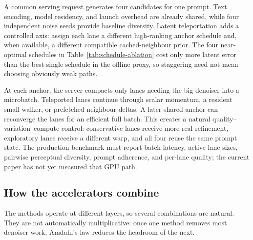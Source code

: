 \documentclass[11pt,a4paper]{article}
\begin{document}
A common serving request generates four candidates for one prompt. Text
encoding, model residency, and launch overhead are already shared, while four
independent noise seeds provide baseline diversity. Latent teleportation adds a
controlled axis: assign each lane a different high-ranking anchor schedule and,
when available, a different compatible cached-neighbour prior. The four
near-optimal schedules in Table~\ref{tab:schedule-ablation} cost only
\StaggeredGap{} more latent error than the best single schedule in the offline
proxy, so staggering need not mean choosing obviously weak paths.

At each anchor, the server compacts only lanes needing the big denoiser into a
microbatch. Teleported lanes continue through scalar momentum, a resident small
walker, or prefetched neighbour deltas. A later shared anchor can reconverge the
lanes for an efficient full batch. This creates a natural
quality--variation--compute control: conservative lanes receive more real
refinement, exploratory lanes receive a different warp, and all four reuse the
same prompt state. The production benchmark must report batch latency,
active-lane sizes, pairwise perceptual diversity, prompt adherence, and
per-lane quality; the current paper has not yet measured that GPU path.

\subsection{How the accelerators combine}

The methods operate at different layers, so several combinations are natural.
They are not automatically multiplicative: once one method removes most
denoiser work, Amdahl's law reduces the headroom of the next.
\end{document}
